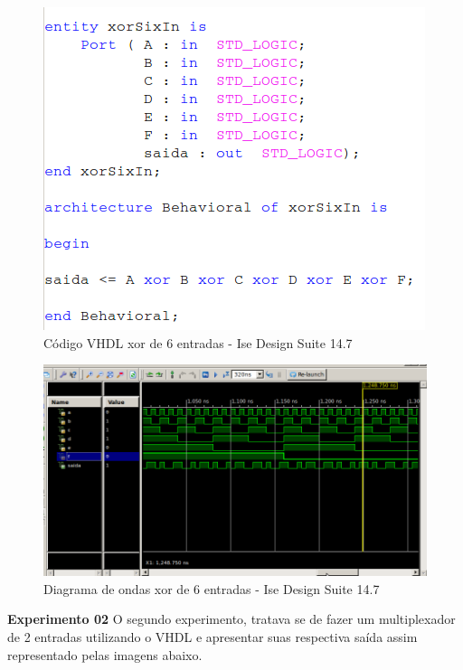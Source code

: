 \documentclass[12pts]{article}
\begin{document}
\begin{figure}[!htb]
  \centering
  \includegraphics[scale=0.6]{img/vhdl01}
  \caption{Código VHDL xor de 6 entradas - Ise Design Suite 14.7}
  \label{figRotulo}
\end{figure}

\begin{figure}[!htb]
  \centering
  \includegraphics[scale=0.4]{img/svhdl01}
  \caption{Diagrama de ondas xor de 6 entradas - Ise Design Suite 14.7}
  \label{figRotulo}
\end{figure}

\textbf{Experimento 02}
\singlespacing
	O segundo experimento, tratava se de fazer um multiplexador de 2 entradas utilizando o VHDL e apresentar suas respectiva saída assim representado pelas imagens abaixo.
\end{document}
